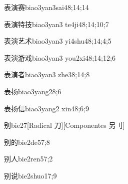 \begin{verbete}{表演赛}{biao3yan3sai4}{8;14;14}
\end{verbete}

\begin{verbete}{表演特技}{biao3yan3 te4ji4}{8;14;10;7}
\end{verbete}

\begin{verbete}{表演艺术}{biao3yan3 yi4shu4}{8;14;4;5}
\end{verbete}

\begin{verbete}{表演游戏}{biao3yan3 you2xi4}{8;14;12;6}
\end{verbete}

\begin{verbete}{表演者}{biao3yan3 zhe3}{8;14;8}
\end{verbete}

\begin{verbete}{表扬}{biao3yang2}{8;6}
\end{verbete}

\begin{verbete}{表扬信}{biao3yang2 xin4}{8;6;9}
\end{verbete}

\begin{verbete}{别}{bie2}{7}[Radical 刀][Componentes 另⺉]
\end{verbete}

\begin{verbete}{别的}{bie2de5}{7;8}
\end{verbete}

\begin{verbete}{别人}{bie2ren5}{7;2}
\end{verbete}

\begin{verbete}{别说}{bie2shuo1}{7;9}
\end{verbete}

